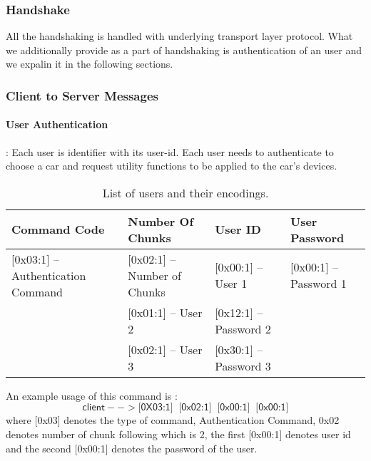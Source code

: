 \subsubsection{Handshake}
\label{sec:pdus:pdu:hs}
All the handshaking is handled with underlying transport layer protocol. What we additionally provide as a part of handshaking is authentication of an user and we expalin it in the following sections.
\subsubsection{Client to Server Messages}
\label{sec:pdus:pdu:c_to_s}

\paragraph{User Authentication}: Each user is identifier with its user-id. Each user needs to authenticate to choose a car and request utility functions to be applied to the car's devices.
\begin{table}[ht!]
  \centering

\begin{tabular}{l l l l}
\hline
\textbf{Command Code} & \textbf{Number Of Chunks} &\textbf{User ID} &   \textbf{User Password}  \\
\hline

\hline
\textsf{[0x03:1]} -- Authentication Command  & \textsf{[0x02:1]} -- Number of Chunks & \textsf{[0x00:1]} -- User 1 & \textsf{[0x00:1]} -- Password 1   \\
\hline
                 & \textsf{[0x01:1]} -- User 2 & \textsf{[0x12:1]} -- Password 2 \\
\hline
                 & \textsf{[0x02:1]}  -- User 3 & \textsf{[0x30:1]} -- Password 3\\
\hline
\hline
\end{tabular}
\caption{List of users and their encodings.}
\end{table}

An example usage of this command is :
\[\textsf{client} --> \textsf{[0X03:1]} \;\;\textsf{[0x02:1]} \;\;\textsf{[0x00:1]} \;\; \textsf{[0x00:1]}\]
where \textsf{[0x03]} denotes the type of command, \textsf{Authentication Command}, \textsf{0x02} denotes number of chunk following which is 2, the first \textsf{[0x00:1]} denotes user id and the second \textsf{[0x00:1]} denotes the password of the user.

